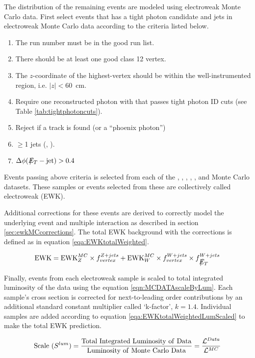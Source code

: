 \documentclass[11pt]{article}
\begin{document}
The distribution of the remaining \elejets events are modeled using  electroweak Monte Carlo data. First select events that has a tight photon candidate and jets in electroweak Monte Carlo data according to the criteria listed below.

\begin{enumerate}
	\item The run number must be in the good run list.
	\item There should be at least one good class 12 vertex.
	\item The $z$-coordinate of the highest-\pt vertex should be within the well-instrumented region, i.e. \mbox{$|z|<60$~cm}.
	\item Require one reconstructed photon with  that passes tight photon ID cuts (see Table \ref{tab:tightphotoncuts}).
	\item Reject if a track is found (or a ``phoenix photon'')
	\item $\geq$1 jets (, ).
	\item $\Delta \phi(\met - \mathrm{jet})>0.4$
\end{enumerate}

Events passing above criteria is selected from each of the \zee, \zmm, \ztt, \wen, \wmn, and \wtn Monte Carlo datasets. These samples or events selected from these are collectively called electroweak (EWK).

Additional corrections for these events are derived to correctly model the underlying event and multiple interaction as described in section \ref{sec:ewkMCcorrections}. The total EWK background with the corrections is defined as in equation \ref{eqa:EWKtotalWeighted}.

\begin{equation}
\mathrm{EWK} = \mathrm{EWK}_{Z}^{MC}\times f_{vertex}^{Z+jets} + \mathrm{EWK}_{W}^{MC}\times f_{vertex}^{W+jets}\times f_{\met}^{W+jets}
\label{eqa:EWKtotalWeighted}
\end{equation}

Finally, events from each electroweak sample is scaled to total integrated luminosity of the data using the equation \ref{eqn:MCDATAscaleByLum}. Each sample's cross section is corrected for next-to-leading order contributions by an additional standard constant multiplier called `k-factor', $k=1.4$. Individual samples are added according to equation \ref{eqa:EWKtotalWeightedLumScaled} to make the total EWK prediction.

\begin{center}
\begin{equation}
\mathrm{Scale}~(S^{lum}) = \mathrm{\frac{Total~Integrated~Luminosity~of~Data}{Luminosity~of~Monte~Carlo~Data}} = \frac{{\cal L}^{Data}}{{\cal L}^{MC}}
\label{eqn:MCDATAscaleByLum}
\end{equation}
\end{center}
\end{document}
